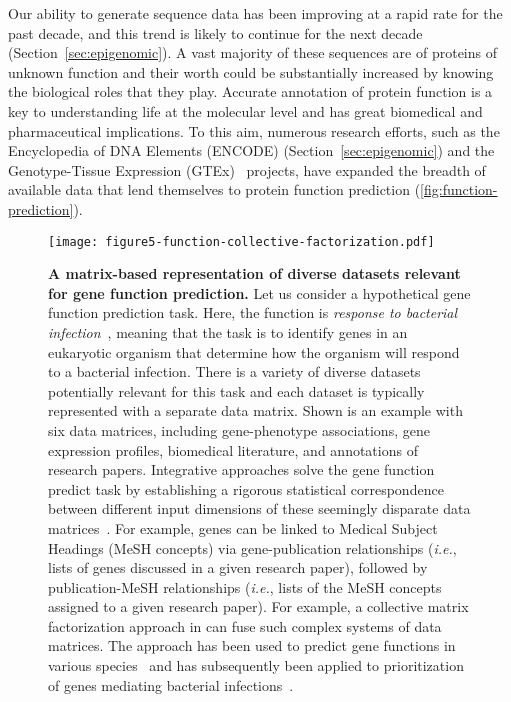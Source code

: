 \documentclass[5p]{elsarticle}
\newcommand{\ie}{\emph{i.e.}\xspace}
\newcommand{\rev}[1]{{\color{black}#1}}
\begin{document}
Our ability to generate sequence data has been improving at a rapid rate for the past decade, and this trend is likely to continue for the next decade (Section~\ref{sec:epigenomic}).
A vast majority of these sequences are of proteins of unknown function and their worth could be substantially increased by knowing the biological roles that they play.
Accurate annotation of protein function is a key to understanding life at the molecular level and has great biomedical and pharmaceutical implications.
To this aim, numerous research efforts, such as the Encyclopedia of DNA Elements (ENCODE) \citep{Encode2012integrated} (Section~\ref{sec:epigenomic}) and the Genotype-Tissue Expression (GTEx)~\citep{Gtex2015genotype} \rev{projects,} have expanded the breadth of available data that lend themselves to protein function prediction (\autoref{fig:function-prediction}).

\begin{figure}[t]
\centering
\texttt{[image: figure5-function-collective-factorization.pdf]}
\caption{\textbf{A matrix-based representation of diverse datasets relevant for gene function prediction.} Let us consider a hypothetical gene function prediction task. Here, the function is {\em response to bacterial infection}~\cite{Typas2015bacterial}, meaning that the task is to identify genes in an eukaryotic organism that determine how the organism will respond to a bacterial infection. There is a variety of diverse datasets potentially relevant for this task and each dataset is typically represented with a separate data matrix. Shown is an example with six data matrices, including gene-phenotype associations, gene expression profiles, biomedical literature, and annotations of research papers. Integrative approaches solve the gene function predict task by establishing a rigorous statistical correspondence between different input dimensions of these seemingly disparate data matrices~\rev{\cite{Zitnik2016jumping,Zitnik2015data,Wang2014similarity,Gonen2012predicting,Gligorijevic2014integration,Zitnik2014drug,Zitnik2014matrix,Gligorijevic2015fuse,Strazar2016orthogonal,Gligorijevic2016patient}}. For example, genes can be linked to \rev{Medical Subject Headings (MeSH concepts)} via gene-publication relationships (\ie, lists of genes discussed in a given research paper), followed by publication-MeSH relationships (\ie, lists of the MeSH concepts assigned to a given research paper). For example, a collective matrix factorization approach in \cite{Zitnik2015data} can fuse such complex systems of data matrices. The approach has been used to predict gene functions in various species~\cite{Zitnik2015data,Zitnik2014matrix} and has subsequently been applied to prioritization of genes mediating bacterial infections~\cite{Zitnik2015collage}.}
\label{fig:function-prediction}
\end{figure}
\end{document}
